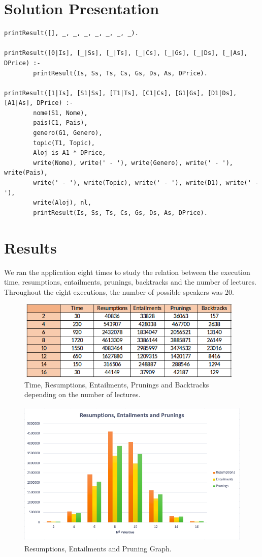 \documentclass[runningheads,a4paper]{llncs}
\begin{document}
\section{Solution Presentation}

\begin{verbatim}
printResult([], _, _, _, _, _, _, _).

printResult([0|Is], [_|Ss], [_|Ts], [_|Cs], [_|Gs], [_|Ds], [_|As], DPrice) :-
        printResult(Is, Ss, Ts, Cs, Gs, Ds, As, DPrice).

printResult([1|Is], [S1|Ss], [T1|Ts], [C1|Cs], [G1|Gs], [D1|Ds], [A1|As], DPrice) :-
        nome(S1, Nome),
        pais(C1, Pais),
        genero(G1, Genero),
        topic(T1, Topic),
        Aloj is A1 * DPrice,
        write(Nome), write(' - '), write(Genero), write(' - '), write(Pais),
        write(' - '), write(Topic), write(' - '), write(D1), write(' - '), 
        write(Aloj), nl,
        printResult(Is, Ss, Ts, Cs, Gs, Ds, As, DPrice).
\end{verbatim}

\section{Results}
We ran the application eight times to study the relation between the execution time, resumptions, entailments, prunings, backtracks and the number of lectures. Throughout the eight executions, the number of possible speakers was 20. 

\begin{figure}[!h]
\centering
\includegraphics[width=10.9cm,height=3.8cm]{Table1}
\caption{Time, Resumptions, Entailments, Prunings and Backtracks depending on the number of lectures.}
\label{fig:Table1}
\end{figure}

\begin{figure}[!h]
\centering
\includegraphics[width=11.5cm,height=7cm]{Graph1}
\caption{Resumptions, Entailments and Pruning Graph.}
\label{fig:Graph1}
\end{figure}
\end{document}
